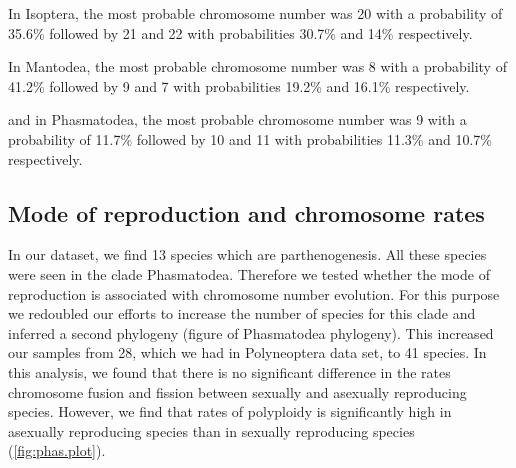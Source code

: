 In Isoptera, the most probable chromosome number was 20 with a probability of 35.6\% followed by 21 and 22 with probabilities 30.7\% and 14\% respectively.

In Mantodea, the most probable chromosome number was 8 with a probability of 41.2\% followed by 9 and 7 with probabilities 19.2\% and 16.1\% respectively.

and in Phasmatodea, the most probable chromosome number was 9 with a probability of 11.7\% followed by 10 and 11 with probabilities 11.3\% and 10.7\% respectively.

\subsection{Mode of reproduction and chromosome rates}
In our dataset, we find 13 species which are parthenogenesis. 
All these species were seen in the clade Phasmatodea.
Therefore we tested whether the mode of reproduction is associated with chromosome number evolution. 
For this purpose we redoubled our efforts to increase the number of species for this clade and inferred a second phylogeny (figure of Phasmatodea phylogeny).
This increased our samples from 28, which we had in Polyneoptera data set, to 41 species. 
In this analysis, we found that there is no significant difference in the rates chromosome fusion and fission between sexually and asexually reproducing species.
However, we find that rates of polyploidy is significantly high in asexually reproducing species than in sexually reproducing species (\cref{fig:phas.plot}).